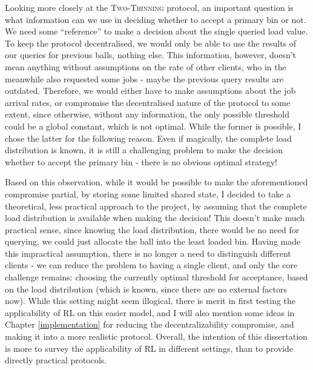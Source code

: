 Looking more closely at the \textsc{Two-Thinning} protocol, an important question is what information can we use in deciding whether to accept a primary bin or not. We need some ``reference'' to make a decision about the single queried load value. To keep the protocol decentralised, we would only be able to use the results of our queries for previous balls, nothing else. This information, however, doesn't mean anything without assumptions on the rate of other clients, who in the meanwhile also requested some jobs - maybe the previous query results are outdated. Therefore, we would either have to make assumptions about the job arrival rates, or compromise the decentralised nature of the protocol to some extent, since otherwise, without any information, the only possible threshold could be a global constant, which is not optimal. While the former is possible, I chose the latter for the following reason. Even if magically, the complete load distribution is known, it is still a challenging problem to make the decision whether to accept the primary bin - there is no obvious optimal strategy! 


Based on this observation, while it would be possible to make the aforementioned compromise partial, by storing some limited shared state, I decided to take a theoretical, less practical approach to the project, by assuming that the complete load distribution is available when making the decision! This doesn't make much practical sense, since knowing the load distribution, there would be no need for querying, we could just allocate the ball into the least loaded bin. Having made this impractical assumption, there is no longer a need to distinguish different clients - we can reduce the problem to having a single client, and only the core challenge remains: choosing the currently optimal threshold for acceptance, based on the load distribution (which is known, since there are no external factors now). While this setting might seem illogical, there is merit in first testing the applicability of RL on this easier model, and I will also mention some ideas in Chapter \ref{implementation} for reducing the decentralizability compromise, and making it into a more realistic protocol. Overall, the intention of this dissertation is more to survey the applicability of RL in different settings, than to provide directly practical protocols.

